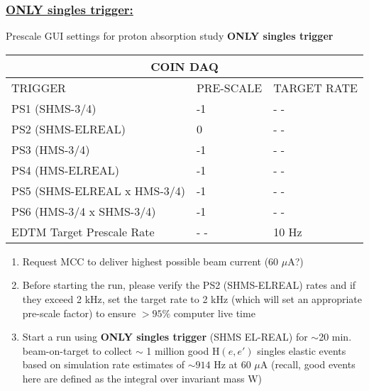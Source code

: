 \documentclass{article}
\begin{document}
\subsubsection*{\underline{ONLY singles trigger:}}
  \begin{center}
    Prescale GUI settings for proton absorption study \textbf{ONLY singles trigger}
    \begin{tabular}{ |p{6cm}| |p{3cm}| |p{3cm}| }
    \hline
    \multicolumn{3}{|c|}{COIN DAQ} \\
    \hline
    TRIGGER & PRE-SCALE & TARGET RATE\\
    \hline
    PS1 (SHMS-3/4)    & -1  & - - \\
    PS2 (SHMS-ELREAL) &  0  & - - \\
    PS3 (HMS-3/4)     & -1  & - -\\
    PS4 (HMS-ELREAL)  & -1  & - - \\
    PS5 (SHMS-ELREAL x HMS-3/4)  & -1 & - -  \\
    PS6 (HMS-3/4 x SHMS-3/4)     & -1 & - -  \\
    \hline
    EDTM Target Prescale Rate & - - & 10 Hz \\
    \hline
    \end{tabular}
    \end{center}
\begin{enumerate}
    \item Request MCC to deliver highest possible beam current (60 $\mu$A?)
    \item Before starting the run, please verify the PS2 (SHMS-ELREAL) rates and if they exceed 2 kHz, set the target rate to 2 kHz (which will set an appropriate pre-scale factor) to ensure $>95\%$ computer live time
    \item Start a run using \textbf{ONLY singles trigger} (SHMS EL-REAL) for $\sim$20 min. beam-on-target to collect $\sim$ 1 million good H$(e,e')$ singles elastic events based on simulation rate estimates of $\sim914$ Hz at 60 $\mu$A (recall, good events here are defined as the integral over invariant mass W)
\end{enumerate}
\end{document}
